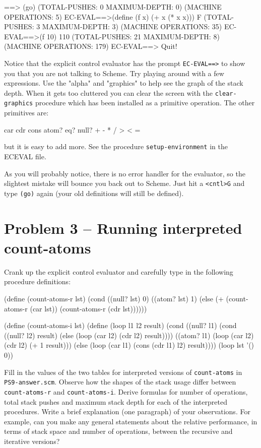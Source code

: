 ==> (go)
(TOTAL-PUSHES: 0 MAXIMUM-DEPTH: 0) 
(MACHINE OPERATIONS: 5) 
EC-EVAL==>(define (f x) (+ x (* x x)))
F 
(TOTAL-PUSHES: 3 MAXIMUM-DEPTH: 3) 
(MACHINE OPERATIONS: 35) 
EC-EVAL==>(f 10)
110 
(TOTAL-PUSHES: 21 MAXIMUM-DEPTH: 8) 
(MACHINE OPERATIONS: 179) 
EC-EVAL==>
Quit!
\endlisp

Notice that the explicit control evaluator has the prompt {\tt EC-EVAL==>}
to show you that you are not talking to Scheme. Try playing around
with a few expressions. Use the "alpha" and "graphics" to help see the
graph of the stack depth. When it gets too cluttered you can clear the
screen with the {\tt clear-graphics} procedure which has been installed as
a primitive operation. The other primitives are:

\beginlisp
    car cdr cons atom? eq? null? + - * / > < = 
\endlisp

\vpar
but it is easy to add more. See the procedure {\tt setup-environment} in
the ECEVAL file.

As you will probably notice, there is no error handler for the
evaluator, so the slightest mistake will bounce you back out to
Scheme. Just hit a {\tt <cntl>G} and type {\tt (go)} again (your old 
definitions will still be defined).

\section{Problem 3 -- Running interpreted count-atoms}
Crank up the explicit control evaluator and carefully type in the
following procedure definitions:

\beginlisp
(define (count-atoms-r lst)
        (cond ((null? lst) 0)
              ((atom? lst) 1)
              (else (+ (count-atoms-r (car lst))
                       (count-atoms-r (cdr lst))))))

(define (count-atoms-i lst)
        (define (loop l1 l2 result)
                (cond ((null? l1) 
                          (cond ((null? l2) result)
                                (else (loop (car l2) (cdr l2) result))))
                      ((atom? l1) (loop (car l2) (cdr l2) (+ 1 result)))
                      (else (loop (car l1) (cons (cdr l1) l2) result))))
        (loop lst '() 0))
\endlisp

Fill in the values of the two tables for interpreted versions of 
{\tt count-atoms} in {\tt PS9-answer.scm}.  Observe how the shapes of the 
stack usage differ between {\tt count-atoms-r} and {\tt count-atoms-i}.  
Derive formulas for number of operations, total stack pushes and maximum 
stack depth for each of the interpreted procedures.   Write a brief 
explanation (one paragraph) of your observations.  For example, can 
you make any general statements about the relative performance, in terms of 
stack space and number of operations, between the recursive and iterative 
versions?  

